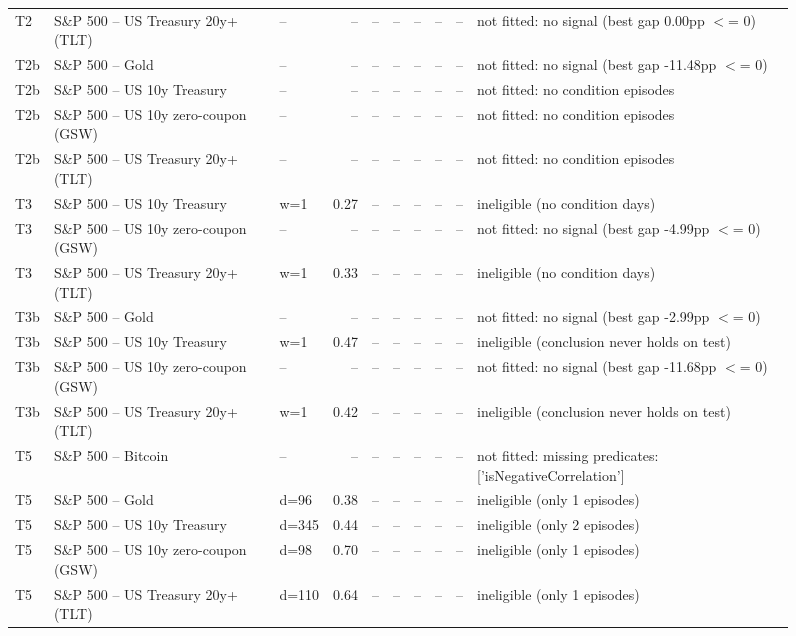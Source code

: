 \begin{figure}
\begin{tabular}{lllrrrrrrl}
T2 & S\&P 500 -- US Treasury 20y+ (TLT) & -- & -- & -- & -- & -- & -- & -- & not fitted: no signal (best gap 0.00pp $<$= 0) \\
T2b & S\&P 500 -- Gold & -- & -- & -- & -- & -- & -- & -- & not fitted: no signal (best gap -11.48pp $<$= 0) \\
T2b & S\&P 500 -- US 10y Treasury & -- & -- & -- & -- & -- & -- & -- & not fitted: no condition episodes \\
T2b & S\&P 500 -- US 10y zero-coupon (GSW) & -- & -- & -- & -- & -- & -- & -- & not fitted: no condition episodes \\
T2b & S\&P 500 -- US Treasury 20y+ (TLT) & -- & -- & -- & -- & -- & -- & -- & not fitted: no condition episodes \\
T3 & S\&P 500 -- US 10y Treasury & w=1 & 0.27 & -- & -- & -- & -- & -- & ineligible (no condition days) \\
T3 & S\&P 500 -- US 10y zero-coupon (GSW) & -- & -- & -- & -- & -- & -- & -- & not fitted: no signal (best gap -4.99pp $<$= 0) \\
T3 & S\&P 500 -- US Treasury 20y+ (TLT) & w=1 & 0.33 & -- & -- & -- & -- & -- & ineligible (no condition days) \\
T3b & S\&P 500 -- Gold & -- & -- & -- & -- & -- & -- & -- & not fitted: no signal (best gap -2.99pp $<$= 0) \\
T3b & S\&P 500 -- US 10y Treasury & w=1 & 0.47 & -- & -- & -- & -- & -- & ineligible (conclusion never holds on test) \\
T3b & S\&P 500 -- US 10y zero-coupon (GSW) & -- & -- & -- & -- & -- & -- & -- & not fitted: no signal (best gap -11.68pp $<$= 0) \\
T3b & S\&P 500 -- US Treasury 20y+ (TLT) & w=1 & 0.42 & -- & -- & -- & -- & -- & ineligible (conclusion never holds on test) \\
T5 & S\&P 500 -- Bitcoin & -- & -- & -- & -- & -- & -- & -- & not fitted: missing predicates: ['isNegativeCorrelation'] \\
T5 & S\&P 500 -- Gold & d=96 & 0.38 & -- & -- & -- & -- & -- & ineligible (only 1 episodes) \\
T5 & S\&P 500 -- US 10y Treasury & d=345 & 0.44 & -- & -- & -- & -- & -- & ineligible (only 2 episodes) \\
T5 & S\&P 500 -- US 10y zero-coupon (GSW) & d=98 & 0.70 & -- & -- & -- & -- & -- & ineligible (only 1 episodes) \\
T5 & S\&P 500 -- US Treasury 20y+ (TLT) & d=110 & 0.64 & -- & -- & -- & -- & -- & ineligible (only 1 episodes) \\

\end{tabular}
\end{figure}
